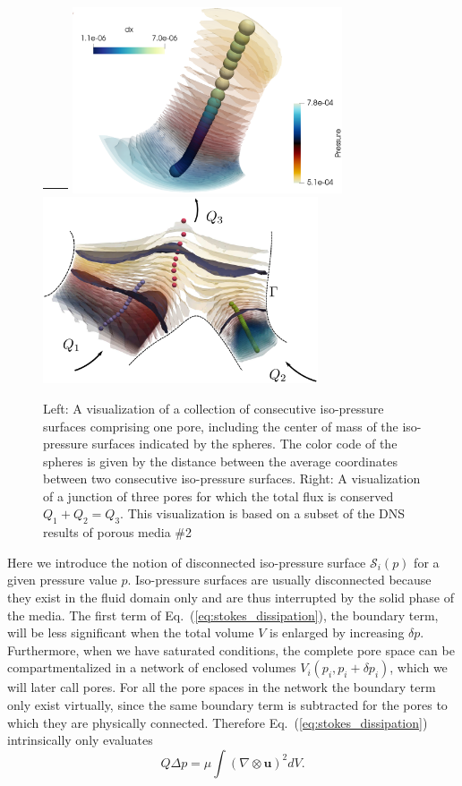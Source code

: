 \documentclass[draft]{agujournal2019}
\providecommand{\DIFdel}[1]{{\protect\color{red}\sout{#1}}}                      %
\providecommand{\DIFdelbegin}{} %
\providecommand{\DIFdelend}{} %
\providecommand{\DIFdelFL}[1]{\DIFdel{#1}} %
\providecommand{\DIFaddbeginFL}{} %
\providecommand{\DIFaddendFL}{} %
\providecommand{\DIFdelbeginFL}{} %
\providecommand{\DIFdelendFL}{} %
\begin{document}
\DIFdelend \begin{figure}[t!]
\DIFdelbeginFL %
\DIFdelFL{~~~~
}%
\DIFdelendFL \DIFaddbeginFL \includegraphics[height=5.5cm]{figures/example_pore_v2.eps}
\includegraphics[height=5.5cm]{figures/merging_pores_v2.eps}
\DIFaddendFL \caption{Left: A visualization of a collection of consecutive iso-pressure surfaces comprising one pore, including the center of mass of the iso-pressure surfaces indicated by the spheres. The color code of the spheres is given by the distance between the average coordinates between two consecutive iso-pressure surfaces. Right: A visualization of a junction of three pores for which the total flux is conserved $Q_1+Q_2 = Q_3$. This visualization is based on a subset of the DNS results of porous media \#2}
\label{fig:isop_surfaces}
\end{figure}
\DIFdelbegin %

\DIFdelend Here we introduce the notion of disconnected iso-pressure surface $\mathcal{S}_i(p)$ for a given pressure value $p$. Iso-pressure surfaces are usually disconnected because they exist in the fluid domain only and are thus interrupted by the solid phase of the media. The first term of Eq.~(\ref{eq:stokes_dissipation}), the boundary term, will be less significant when the total volume $V$ is enlarged by increasing $\delta p$. Furthermore, when we have saturated conditions, the complete pore space can be compartmentalized in a network of enclosed volumes $V_i(p_i, p_i+\delta p_i )$, which we will later call pores. For all the pore spaces in the network the boundary term only exist virtually, since the same boundary term is subtracted for the pores to which they are physically connected. Therefore Eq.~(\ref{eq:stokes_dissipation}) intrinsically only evaluates
\begin{equation}
Q \Delta p=\mu\int (\nabla \otimes \mathbf{u})^2 dV.\label{eq:pore_based_energy_dissipation}
\end{equation}
\end{document}
